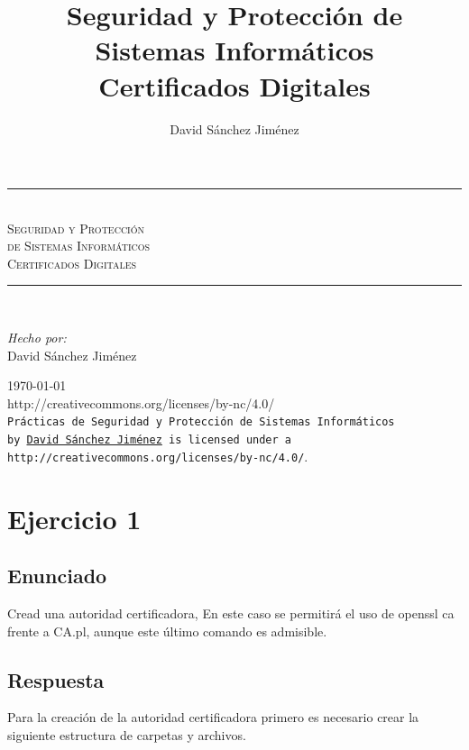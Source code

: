 \documentclass[10pt,a4paper,spanish]{report}
\title{Seguridad y Protección de Sistemas Informáticos \\
Certificados Digitales}
\author{David Sánchez Jiménez}
\newcommand{\HRule}{\rule{\linewidth}{0.5mm}} %
\begin{document}
\begin{titlepage}
 \begin{center}
  \HRule \\[0.8cm]
  \textsc{\huge Seguridad y Protección \\ de Sistemas Informáticos \\[0.5cm] Certificados Digitales}\\[1.6cm]
  \HRule \\[1cm]
  \begin{flushleft}
   \emph{Hecho por:}\\
   David Sánchez Jiménez
  \end{flushleft}
  \vspace{12cm}
  \large{\today}\\
  \vspace{0.5cm}
  {http://creativecommons.org/licenses/by-nc/4.0/}\\[0.5cm]
  \texttt{Prácticas de Seguridad y Protección de Sistemas Informáticos\\ by
   \href{mailto:dasaji92@gmail.com}{David Sánchez Jiménez} is licensed under a 
   {http://creativecommons.org/licenses/by-nc/4.0/}}.\\[3mm]
 \end{center}
\end{titlepage}

\tableofcontents
\newpage

\chapter{Ejercicio 1}

\section{Enunciado}
\noindent
Cread una autoridad certificadora, En este caso se permitirá el uso de openssl ca frente a CA.pl, aunque este último comando es admisible.

\section{Respuesta}
\noindent
Para la creación de la autoridad certificadora primero es necesario crear la siguiente estructura de carpetas y archivos.
\end{document}
